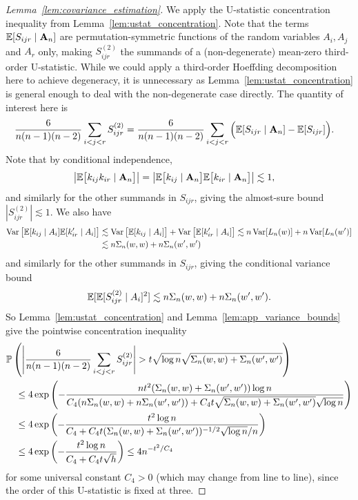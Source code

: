 \begin{proof}[Lemma~\ref{lem:covariance_estimation}]
  We apply the U-statistic concentration inequality from
  Lemma~\ref{lem:ustat_concentration}.
  Note that the terms
  $\E[S_{ijr} \mid \bA_n]$
  are permutation-symmetric functions of
  the random variables
  $A_i, A_j$ and $A_r$ only,
  making $S_{ijr}^{(2)}$ the summands of
  a (non-degenerate) mean-zero third-order U-statistic.
  While we could apply a third-order Hoeffding decomposition
  here to achieve degeneracy,
  it is unnecessary as Lemma~\ref{lem:ustat_concentration}
  is general enough to deal with the non-degenerate case directly.
  The quantity of interest here is
  \begin{align*}
    \frac{6}{n(n-1)(n-2)}
    \sum_{i<j<r}
    S_{ijr}^{(2)}
    &=
    \frac{6}{n(n-1)(n-2)}
    \sum_{i<j<r}
    \Big(
    \E[S_{ijr} \mid \bA_n]
    - \E[S_{ijr}]
    \Big).
  \end{align*}
  Note that by conditional independence,
  \begin{align*}
    \big|
    \E\big[
    k_{ij}k_{ir} \mid \bA_n
    \big]
    \big|
    &=
    \big|
    \E\big[
      k_{ij} \mid \bA_n
      \big]
    \E\big[
      k_{ir} \mid \bA_n
      \big]
    \big|
    \lesssim 1,
  \end{align*}
  and similarly for the other summands in $S_{ijr}$,
  giving the almost-sure bound
  $|S_{ijr}^{(2)}| \lesssim 1$.
  We also have
  \begin{align*}
    \Var\big[ \E[k_{ij} \mid A_i] \E[k_{ir}' \mid A_i] \big]
    &\lesssim
    \Var\big[\E[k_{ij} \mid A_i]\big]
    + \Var\big[\E[k_{ir}' \mid A_i]\big]
    \lesssim
    n \Var[L_n(w)] + n \Var[L_n(w')] \\
    &\lesssim
    n \Sigma_n(w,w) + n \Sigma_n(w',w')
  \end{align*}
  and similarly for the other summands in $S_{ijr}$,
  giving the conditional variance bound
  \begin{align*}
    \E[\E[S_{ijr}^{(2)} \mid A_i]^2] \lesssim
    n \Sigma_n(w,w) + n \Sigma_n(w',w').
  \end{align*}
  So Lemma~\ref{lem:ustat_concentration}
  and Lemma~\ref{lem:app_variance_bounds}
  give the pointwise concentration inequality
  \begin{align*}
    &\P\left(
      \Bigg|
      \frac{6}{n(n-1)(n-2)}
      \sum_{i<j<r}
      S_{ijr}^{(2)}
      \Bigg|
      > t \sqrt{\log n} \sqrt{\Sigma_n(w,w) + \Sigma_n(w',w')}
    \right) \\
    &\quad\leq
    4 \exp \left(
      - \frac{n t^2 (\Sigma_n(w,w) + \Sigma_n(w',w')) \log n}
      {C_4 (n\Sigma_n(w,w) + n\Sigma_n(w',w'))
        + C_4 t \sqrt{\Sigma_n(w,w) + \Sigma_n(w',w')}\sqrt{\log n}}
    \right) \\
    &\quad\leq
    4 \exp \left(
      - \frac{t^2 \log n}
      {C_4
        + C_4 t (\Sigma_n(w,w) + \Sigma_n(w',w'))^{-1/2} \sqrt{\log n} / n}
    \right) \\
    &\quad\leq
    4 \exp \left(
      - \frac{t^2 \log n}
      {C_4
        + C_4 t \sqrt{h}}
    \right)
    \leq
    4 n^{-t^2 / C_4}
  \end{align*}
  for some universal constant $C_4 > 0$
  (which may change from line to line),
  since the order of this U-statistic is fixed at three.


\end{proof}
